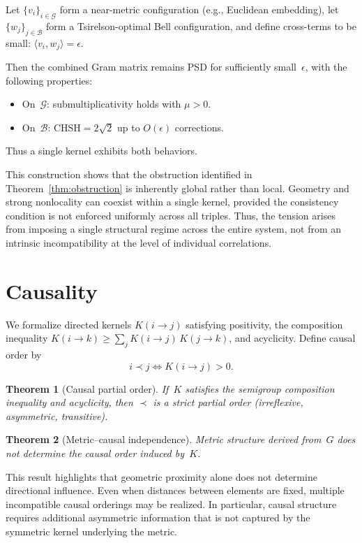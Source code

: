 \documentclass[11pt,a4paper]{article}
\newtheorem{theorem}{Theorem}[section]
\theoremstyle{definition}
\theoremstyle{remark}
\newcommand{\CHSH}{\mathrm{CHSH}}
\newcommand{\ip}[2]{\langle #1, #2 \rangle}
\begin{document}
Let $\{v_i\}_{i\in \mathcal{G}}$ form a near-metric configuration (e.g., Euclidean embedding), let $\{w_j\}_{j\in \mathcal{B}}$ form a Tsirelson-optimal Bell configuration, and define cross-terms to be small: $\ip{v_i}{w_j} = \epsilon$.

Then the combined Gram matrix remains PSD for sufficiently small~$\epsilon$, with the following properties:
\begin{itemize}[nosep]
  \item On~$\mathcal{G}$: submultiplicativity holds with $\mu > 0$.
  \item On~$\mathcal{B}$: $\CHSH = 2\sqrt{2}$ up to $O(\epsilon)$ corrections.
\end{itemize}
Thus a single kernel exhibits both behaviors.

This construction shows that the obstruction identified in Theorem~\ref{thm:obstruction} is inherently global rather than local. Geometry and strong nonlocality can coexist within a single kernel, provided the consistency condition is not enforced uniformly across all triples. Thus, the tension arises from imposing a single structural regime across the entire system, not from an intrinsic incompatibility at the level of individual correlations.


\section{Causality}\label{sec:causality}

We formalize directed kernels $K(i\to j)$ satisfying positivity, the composition inequality $K(i\to k) \ge \sum_j K(i\to j)\,K(j\to k)$, and acyclicity. Define causal order by
\[
i \prec j \iff K(i\to j) > 0.
\]

\begin{theorem}[Causal partial order]\label{thm:causal-po}
If~$K$ satisfies the semigroup composition inequality and acyclicity, then $\prec$ is a strict partial order (irreflexive, asymmetric, transitive).
\end{theorem}

\begin{theorem}[Metric--causal independence]\label{thm:independence}
Metric structure derived from~$G$ does not determine the causal order induced by~$K$.
\end{theorem}

This result highlights that geometric proximity alone does not determine directional influence. Even when distances between elements are fixed, multiple incompatible causal orderings may be realized. In particular, causal structure requires additional asymmetric information that is not captured by the symmetric kernel underlying the metric.
\end{document}
